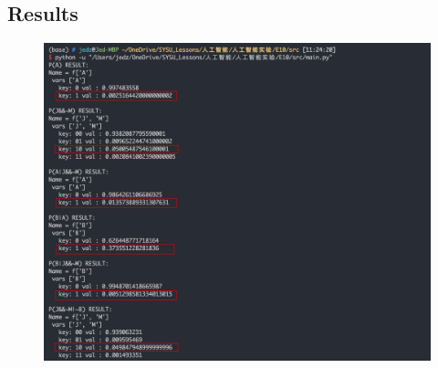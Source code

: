 \documentclass[a4paper, 11pt]{article}
\begin{document}
\subsection{Results}
\begin{figure}[ht]
\centering
\includegraphics[width=15cm]{Pic/myresults.png}
\end{figure}

%
%
\end{document}
